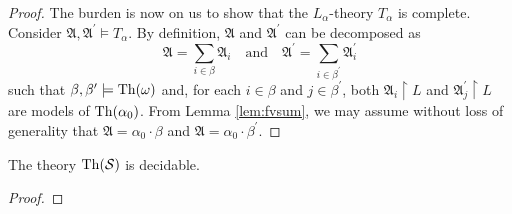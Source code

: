 \begin{proof}
	The burden is now on us to show that the $L_\alpha$-theory $T_\alpha$ is complete.  Consider $\mathfrak{A},\mathfrak{A}^\prime\models T_\alpha$.  By definition, $\mathfrak{A}$ and $\mathfrak{A}^\prime$ can be decomposed as
	\begin{equation}
		\mathfrak{A}=\sum_{i\in\beta}\mathfrak{A}_i \quad\text{and}\quad \mathfrak{A}^\prime=\sum_{i\in\beta^\prime}\mathfrak{A}^\prime_i
	\end{equation}
	such that $\beta,\beta^\prime\models\operatorname{Th}(\omega)$ and, for each $i\in\beta$ and $j\in\beta^\prime$, both $\mathfrak{A}_i\restriction L$ and $\mathfrak{A}^\prime_j\restriction L$ are models of $\operatorname{Th}(\alpha_0)$.  From Lemma \ref{lem:fvsum}, we may assume without loss of generality that $\mathfrak{A}=\alpha_0\cdot\beta$ and $\mathfrak{A}=\alpha_0\cdot\beta^\prime$.
\end{proof}

\begin{thm}
	The theory $\operatorname{Th}(\mathcal{S})$ is decidable.
\end{thm}
\begin{proof}
\end{proof}
